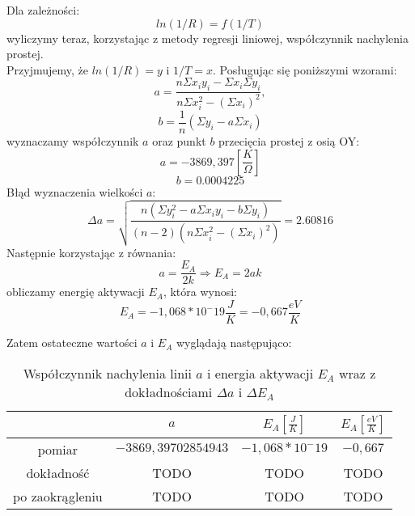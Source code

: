 \documentclass[10pt,a4paper]{article}
\newcommand{\forceindent}{\leavevmode{\parindent=3em\indent}}
\begin{document}
\forceindent Dla zależności:
\begin{equation}
ln(1/R) = f(1/T)
\end{equation}  
wyliczymy teraz, korzystając z metody regresji liniowej, współczynnik nachylenia prostej.\\
Przyjmujemy, że $ln(1/R) = y$ i $1/T = x$.
Posługując się poniższymi wzorami:
\begin{equation}
a=\frac{n\Sigma x_i y_i - \Sigma x_i \Sigma y_i}{n\Sigma x_i^2 - (\Sigma x_i)^2},
\end{equation}
\begin{equation}
b=\frac{1}{n} \left( \Sigma y_i - a\Sigma x_i \right)
\end{equation}
wyznaczamy współczynnik $a$ oraz punkt $b$ przecięcia prostej z osią OY:
\begin{equation}
a = -3869,397 \left[\frac{K}{\Omega}\right]
\end{equation}
\begin{equation}
b = 0.0004225 
\end{equation}
Błąd wyznaczenia wielkości $a$:\\
$$ \Delta a = \sqrt{\frac{n(\Sigma y_i ^2 - a \Sigma x_i y_i - b\Sigma y_i)}{(n-2)(n \Sigma x_i ^2 - (\Sigma x_i)^2)}} = 2.60816$$
Następnie korzystając z równania:
\begin{equation}
a = \frac{E_A}{2k} \Rightarrow E_A = 2ak
\end{equation}
obliczamy energię aktywacji $E_A$, która wynosi:
$$ E_A = -1,068 * 10^-19 \frac{J}{K} = -0,667 \frac{eV}{K} $$





\forceindent Zatem ostateczne wartości $a$ i $E_A$ wyglądają następująco:

\begin{table}[!h]
\centering
\begin{tabular}{|cc||c|c|}
\multicolumn{1}{c}{} & \multicolumn{1}{c}{$a$} & \multicolumn{1}{c}{$E_A [\frac{J}{K}]$} & \multicolumn{1}{c}{$E_A [\frac{eV}{K}]$}\\
\hline
pomiar & $-3869,39702854943$ & $-1,068 * 10^-19$ & $-0,667$\\
\hline
dokładność & TODO & TODO & TODO\\
\hline
po zaokrągleniu & TODO  & TODO & TODO\\
\hline
\end{tabular}
\caption{Współczynnik nachylenia linii $a$ i energia aktywacji $E_A$ wraz z dokładnościami $\Delta a$ i $\Delta E_A$}
\end{table}
\end{document}
